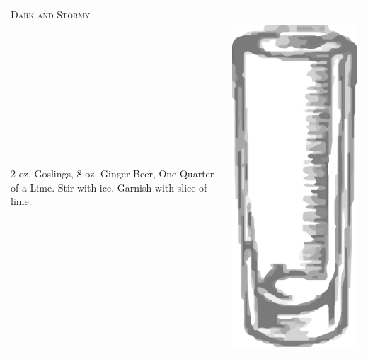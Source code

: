 \documentclass{article}
\begin{document}
\begin{tabular}{p{2in} p{0.5in}}
  \multicolumn{2}{p{3in}}{\centering\Huge\textsc{Dark and Stormy}} \\ 
  
   \vspace{-0.1in}2 oz. Goslings, 8 oz. Ginger Beer, One Quarter of a
    Lime. Stir with ice. Garnish with slice of lime. &
   \vspace{-0.1in} \includegraphics{collins.png}
\end{tabular}
\end{document}
